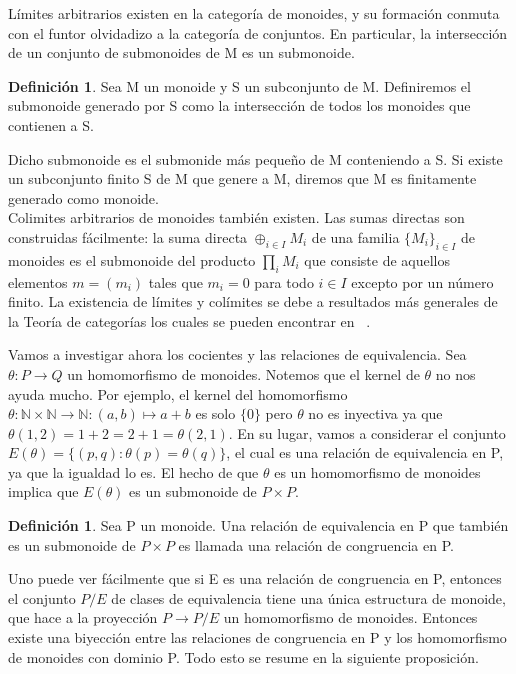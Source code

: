 \documentclass[12pt,spanish]{amsart}
\newcommand{\bb}[1]{\mathbb{#1}}
\theoremstyle{definition}
\newtheorem{Def}[Theorem]{Definición}
\theoremstyle{remark}
\begin{document}
Límites arbitrarios existen en la categoría de monoides, y su formación conmuta con el funtor olvidadizo a la categoría de conjuntos. En particular, la intersección de un conjunto de submonoides de M es un submonoide.

\begin{Def}
Sea M un monoide y S un subconjunto de M. Definiremos el submonoide generado por S como la intersección de todos los monoides que contienen a S. 
\end{Def}

Dicho submonoide es el submonide más pequeño de M conteniendo a S. Si existe un subconjunto finito S de M que genere a M, diremos que M es finitamente generado como monoide. \\
Colimites arbitrarios de monoides también existen. Las sumas directas son construidas fácilmente: la suma directa $\oplus_{i\in I} M_{i}$ de una familia $\{M_{i}\}_{i\in I}$ de monoides es el submonoide del producto $\prod_{i}M_{i}$ que consiste de aquellos elementos $m=(m_{i})$ tales que $m_{i}=0$ para todo $i\in I$ excepto por un número finito. La existencia de límites y colímites se debe a resultados más generales de la Teoría de categorías los cuales se pueden encontrar en ~\cite{vakil2017rising}.

Vamos a investigar ahora los cocientes y las relaciones de equivalencia. Sea $\theta:P \to Q$ un homomorfismo de monoides. Notemos que el kernel de $\theta$ no nos ayuda mucho. Por ejemplo, el kernel del homomorfismo $\theta:\bb{N}\times \bb{N} \to \bb{N}:(a,b) \mapsto a+b$ es solo $\{0\}$ pero $\theta$ no es inyectiva ya que $\theta(1,2)=1+2=2+1=\theta(2,1)$. En su lugar, vamos a considerar el conjunto $E(\theta)=\{(p,q):\theta(p)=\theta(q)\}$, el cual es una relación de equivalencia en P, ya que la igualdad lo es. El hecho de que $\theta$ es un homomorfismo de monoides implica que $E(\theta)$ es un submonoide de $P\times P$.

\begin{Def}
Sea P un monoide. Una relación de equivalencia en P que también es un submonoide de $P\times P$ es llamada una relación de congruencia en P. 
\end{Def}

Uno puede ver fácilmente que si E es una relación de congruencia en P, entonces el conjunto $P/E$ de clases de equivalencia tiene una única estructura de monoide, que hace a la proyección $P \to P/E$ un homomorfismo de monoides. Entonces existe una biyección entre las relaciones de congruencia en P y los homomorfismo de monoides con dominio P. Todo esto se resume en la siguiente proposición. 
\end{document}
